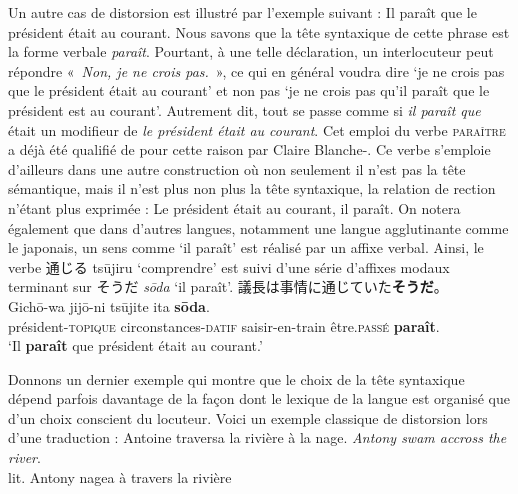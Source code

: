 {    Un autre cas de distorsion est illustré par l’exemple suivant :
    \ea
    {Il paraît que le président était au courant.}
    \z
    Nous savons que la tête syntaxique de cette phrase est la forme verbale \textit{paraît}. Pourtant, à une telle déclaration, un interlocuteur peut répondre «~\textit{Non, je ne crois pas.}~», ce qui en général voudra dire ‘je ne crois pas que le président était au courant’ et non pas ‘je ne crois pas qu’il paraît que le président est au courant’. Autrement dit, tout se passe comme si \textit{il paraît que} était un modifieur de \textit{le président était au courant}. Cet emploi du verbe \textsc{paraître} a déjà été qualifié de  pour cette raison par Claire Blanche-\citet{Benveniste1989}. Ce verbe s’emploie d’ailleurs dans une autre construction où non seulement il n’est pas la tête sémantique, mais il n’est plus non plus la tête syntaxique, la relation de rection n’étant plus exprimée :
    \ea
    {Le président était au courant, il paraît.}
    \z
    On notera également que dans d’autres langues, notamment une langue agglutinante comme le japonais, un sens comme ‘il paraît’ est réalisé par un affixe verbal. Ainsi, le verbe \textrm{通じる} tsūjiru ‘comprendre’ est suivi d’une série d’affixes modaux terminant sur \textrm{そうだ} \textit{sōda} ‘il paraît’.
    \ea
    \textrm{議長は事情に通じていた}\textrm{\textbf{そうだ}}\textrm{。}\\
     {Gichō-wa}  {jijō-ni}  {tsūjite}  {ita} \textbf{{sōda}}.\\
    président-\textsc{topique} circonstances-\textsc{datif} saisir-en-train être.\textsc{passé} \textbf{paraît}.\\
    ‘Il \textbf{paraît} que président était au courant.’
    \z

    Donnons un dernier exemple qui montre que le choix de la tête syntaxique dépend parfois davantage de la façon dont le lexique de la langue est organisé que d’un choix conscient du locuteur. Voici un exemple classique de distorsion lors d’une traduction :
    \ea
    {Antoine traversa la rivière à la nage}.
    \textit{Antony swam accross the river}.\\
    lit. Antony nagea à travers la rivière
    \z

}
